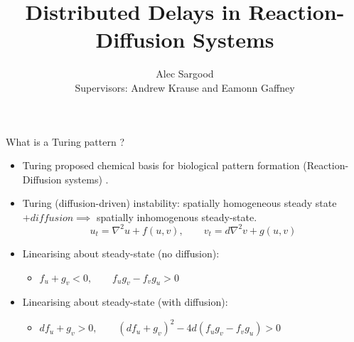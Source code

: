 \documentclass{beamer}
\title[Distributed Delays in R-D systems]{Distributed Delays in Reaction-Diffusion Systems}
\author[A Sargood, A Krause, E Gaffney ]{Alec Sargood\\Supervisors: Andrew Krause and Eamonn Gaffney}
\begin{document}
\begin{frame}
  \titlepage
\end{frame}

\begin{frame}{What is a Turing pattern ? \cite{murray}}
    \begin{itemize}
    \item Turing proposed chemical basis for biological pattern formation (Reaction-Diffusion systems) \cite{turing}.
    \item Turing (diffusion-driven) instability: spatially homogeneous steady state $+diffusion\implies$ spatially inhomogenous steady-state.
    \begin{equation}
        u_t=\nabla^2u+f(u,v),\quad \quad v_t=d\nabla^2v+g(u,v)
    \end{equation}
    \item Linearising about steady-state (no diffusion):
    \begin{itemize}
        \item $f_u+g_v<0, \quad \quad f_ug_v-f_vg_u>0$
    \end{itemize}
    \item Linearising about steady-state (with diffusion):
    \begin{itemize}
        \item $df_u+g_v>0, \quad \quad (df_u+g_v)^2-4d(f_ug_v-f_vg_u)>0$
    \end{itemize}
\end{itemize}
\end{frame}
\end{document}
